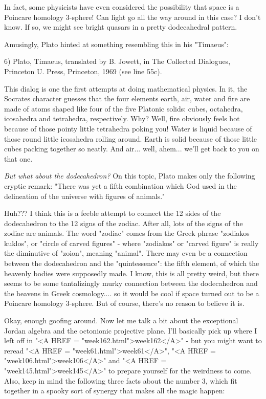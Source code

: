 In fact, some physicists have even considered the possibility that space
is a Poincare homology 3-sphere!  Can light go all the way around in
this case?  I don't know.  If so, we might see bright quasars in a
pretty dodecahedral pattern.  

Amusingly, Plato hinted at something resembling this in his "Timaeus":

6) Plato, Timaeus, translated by B. Jowett, in The Collected Dialogues,
Princeton U. Press, Princeton, 1969 (see line 55c).

This dialog is one the first attempts at doing mathematical physics.  
In it, the Socrates character guesses that the four elements earth, 
air, water and fire are made of atoms shaped like four of the five 
Platonic solids: cubes, octahedra, icosahedra and tetrahedra, respectively.   
Why?  Well, fire obviously feels hot because of those pointy little 
tetrahedra poking you!  Water is liquid because of those round little 
icosahedra rolling around.  Earth is solid because of those little cubes 
packing together so neatly.  And air... well, ahem... we'll get back to 
you on that one.

\emph{But what about the dodecahedron?}  On this topic, Plato makes only the
following cryptic remark: "There was yet a fifth combination which God
used in the delineation of the universe with figures of animals."  

Huh???  I think this is a feeble attempt to connect the 12 sides of the
dodecahedron to the 12 signs of the zodiac.  After all, lots of the
signs of the zodiac are animals.  The word "zodiac" comes from the
Greek phrase "zodiakos kuklos", or "circle of carved figures" - where
"zodiakos" or "carved figure" is really the diminutive of "zoion",
meaning "animal".  There may even be a connection between the
dodecahedron and the "quintessence": the fifth element, of which the
heavenly bodies were supposedly made.  I know, this is all pretty weird,
but there seems to be some tantalizingly murky connection between the
dodecahedron and the heavens in Greek cosmology.... so it would be cool
if space turned out to be a Poincare homology 3-sphere.  But of course,
there's no reason to believe it is.

Okay, enough goofing around.  Now let me talk a bit about the
exceptional Jordan algebra and the octonionic projective plane.  I'll
basically pick up where I left off in "<A HREF = "week162.html">week162</A>" - but you might want to
reread "<A HREF = "week61.html">week61</A>", "<A HREF = "week106.html">week106</A>" and "<A HREF = "week145.html">week145</A>" to prepare yourself for the
weirdness to come.   Also, keep in mind the following three facts about
the number 3, which fit together in a spooky sort of synergy that makes
all the magic happen:

